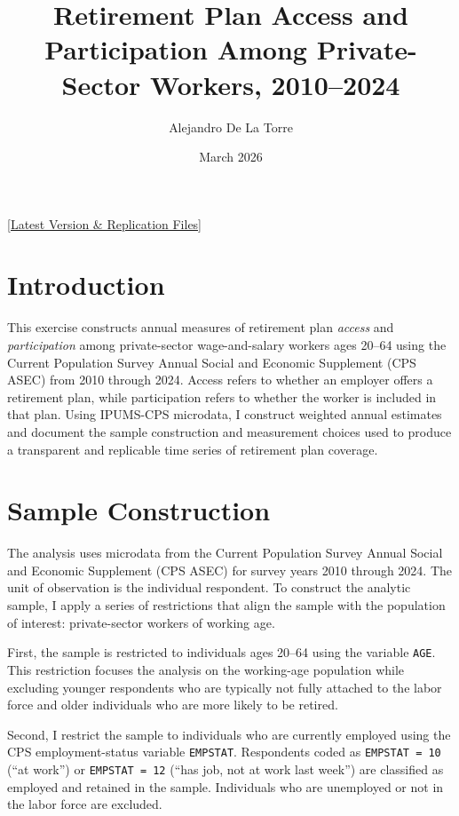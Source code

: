 \documentclass[11pt]{article}
\title{Retirement Plan Access and Participation Among Private-Sector Workers, 2010--2024}
\author{Alejandro De La Torre}
\date{March 2026}
\begin{document}
\maketitle
\begin{center}
\small
\href{https://github.com/adelatorre2/rsp-retirement-access-asec/}{[Latest Version \& Replication Files]}
\end{center}

\section{Introduction}


This exercise constructs annual measures of retirement plan \emph{access} and \emph{participation} among private-sector wage-and-salary workers ages 20--64 using the Current Population Survey Annual Social and Economic Supplement (CPS ASEC) from 2010 through 2024. Access refers to whether an employer offers a retirement plan, while participation refers to whether the worker is included in that plan. Using IPUMS-CPS microdata, I construct weighted annual estimates and document the sample construction and measurement choices used to produce a transparent and replicable time series of retirement plan coverage.


\section{Sample Construction}

The analysis uses microdata from the Current Population Survey Annual Social and Economic Supplement (CPS ASEC) for survey years 2010 through 2024. The unit of observation is the individual respondent. To construct the analytic sample, I apply a series of restrictions that align the sample with the population of interest: private-sector workers of working age.

First, the sample is restricted to individuals ages 20--64 using the variable \texttt{AGE}. This restriction focuses the analysis on the working-age population while excluding younger respondents who are typically not fully attached to the labor force and older individuals who are more likely to be retired.

Second, I restrict the sample to individuals who are currently employed using the CPS employment-status variable \texttt{EMPSTAT}. Respondents coded as \texttt{EMPSTAT = 10} (``at work'') or \texttt{EMPSTAT = 12} (``has job, not at work last week'') are classified as employed and retained in the sample. Individuals who are unemployed or not in the labor force are excluded.
\end{document}
